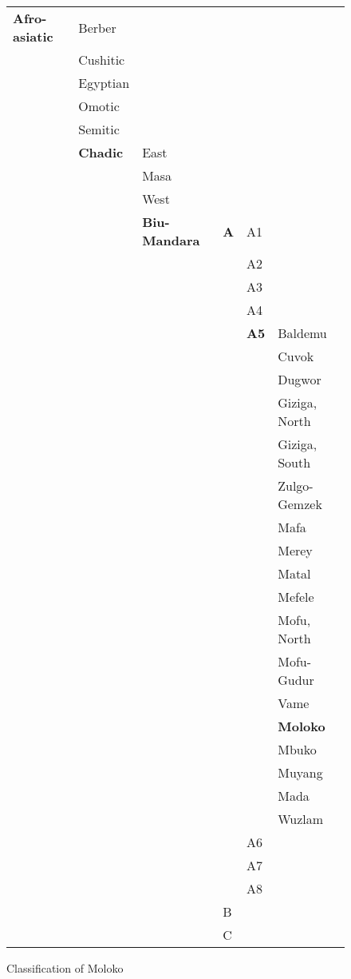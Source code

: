 \begin{figure}
\begin{tabular}{llllll}
\textbf{Afro-asiatic}  &  Berber\\
&    Cushitic\\
&    Egyptian\\
&    Omotic\\
&    Semitic\\
&    \textbf{Chadic} &  East\\
 & &     Masa\\
& &      West\\
& &\textbf{Biu-Mandara}  &  \textbf{A}  &  A1\\
& & & &           A2\\
& & & &           A3\\
& & & &            A4\\
& & & &          \textbf{A5}  &  Baldemu\\
& & & & &             Cuvok\\
& & & & &              Dugwor\\
& & & & &             Giziga, North\\
& & & & &              Giziga, South\\
& & & & &            Zulgo-Gemzek\\
& & & & &             Mafa\\
& & & & &            Merey\\
& & & & &             Matal\\
& & & & &            Mefele\\
& & & & &             Mofu, North\\
& & & & &            Mofu-Gudur\\
& & & & &            Vame\\
& & & & &            \textbf{Moloko}\\
& & & & &              Mbuko\\
& & & & &     Muyang\\
& & & & &              Mada\\
& & & & &              Wuzlam\\
& & & &             A6\\
& & & &             A7\\
& & & &            A8\\
& & &           B\\
& & &           C
\end{tabular}

\caption{Classification of Moloko}
\label{fig:1.1}
\end{figure}

